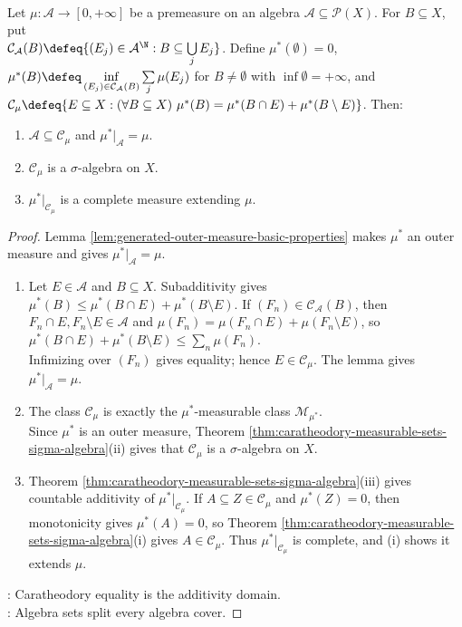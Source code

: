 \begin{theorem} \label{thm:generated-caratheodory-extension} \\
Let $\mu:\mathcal{A}\to[0,+\infty]$ be a premeasure on an algebra $\mathcal{A}\subseteq\mathcal{P}(X)$. For $B\subseteq X$, put\\
$\mathcal{C}_{\mathcal{A}}(B)\defeq\{(E_j)\in\mathcal{A}^{\N}:B\subseteq\bigcup\limits_jE_j\}$. Define $\mu^\ast(\emptyset)=0$, $\mu^\ast(B)\defeq\inf\limits_{(E_j)\in\mathcal{C}_{\mathcal{A}}(B)}\sum\limits_j\mu(E_j)$ for $B\neq\emptyset$ with $\inf\emptyset=+\infty$, and $\mathcal{C}_\mu\defeq\{E\subseteq X:(\forall B\subseteq X)\ \mu^\ast(B)=\mu^\ast(B\cap E)+\mu^\ast(B\setminus E)\}$. Then:
\begin{enumerate}[label=(\roman*)]
\setlength{\itemsep}{0pt}
\item $\mathcal{A}\subseteq\mathcal{C}_\mu$ and $\mu^\ast|_{\mathcal{A}}=\mu$.
\item $\mathcal{C}_\mu$ is a $\sigma$-algebra on $X$.
\item $\mu^\ast|_{\mathcal{C}_\mu}$ is a complete measure extending $\mu$.
\end{enumerate}
\begin{proof}
Lemma \ref{lem:generated-outer-measure-basic-properties} makes $\mu^\ast$ an outer measure and gives $\mu^\ast|_{\mathcal{A}}=\mu$.
\begin{enumerate}[label=(\roman*)]
\setlength{\itemsep}{0pt}
\item Let $E\in\mathcal{A}$ and $B\subseteq X$. Subadditivity gives $\mu^\ast(B)\leq\mu^\ast(B\cap E)+\mu^\ast(B\setminus E)$. If $(F_n)\in\mathcal{C}_{\mathcal{A}}(B)$, then $F_n\cap E,F_n\setminus E\in\mathcal{A}$ and $\mu(F_n)=\mu(F_n\cap E)+\mu(F_n\setminus E)$, so $\mu^\ast(B\cap E)+\mu^\ast(B\setminus E)\leq\sum\limits_n\mu(F_n)$.\\
Infimizing over $(F_n)$ gives equality; hence $E\in\mathcal{C}_\mu$. The lemma gives $\mu^\ast|_{\mathcal{A}}=\mu$.
\item The class $\mathcal{C}_\mu$ is exactly the $\mu^\ast$-measurable class $\mathcal{M}_{\mu^\ast}$.\\
Since $\mu^\ast$ is an outer measure, Theorem \ref{thm:caratheodory-measurable-sets-sigma-algebra}(ii) gives that $\mathcal{C}_\mu$ is a $\sigma$-algebra on $X$.
\item Theorem \ref{thm:caratheodory-measurable-sets-sigma-algebra}(iii) gives countable additivity of $\mu^\ast|_{\mathcal{C}_\mu}$. If $A\subseteq Z\in\mathcal{C}_\mu$ and $\mu^\ast(Z)=0$, then monotonicity gives $\mu^\ast(A)=0$, so Theorem \ref{thm:caratheodory-measurable-sets-sigma-algebra}(i) gives $A\in\mathcal{C}_\mu$. Thus $\mu^\ast|_{\mathcal{C}_\mu}$ is complete, and (i) shows it extends $\mu$.
\end{enumerate}
: Caratheodory equality is the additivity domain.\\
: Algebra sets split every algebra cover.
\end{proof}
\end{theorem}

